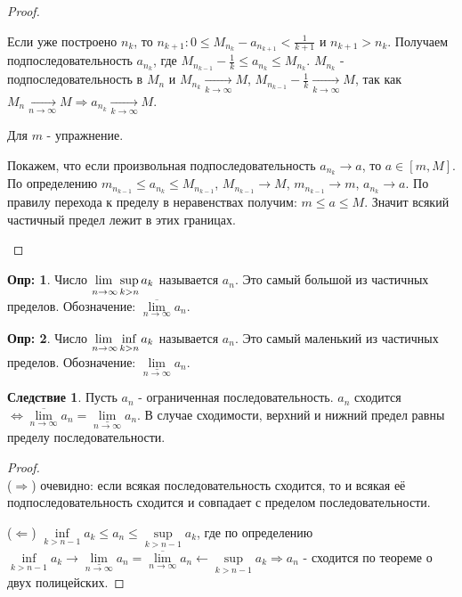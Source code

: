 \documentclass[12pt]{article}
\theoremstyle{definition}
\newtheorem{defn}{Опр:}
\newtheorem{corollary}{Следствие}
\begin{document}
\begin{proof}
\begin{enumerate}[label={(\arabic*)}]
	Если уже построено $n_k$, то $n_{k+1} \colon 0 \leq M_{n_k}\! - a_{n_{k+1}} < \frac{1}{k+1}$ и $n_{k+1} > n_k$. Получаем подпоследовательность $a_{n_k}$, где $M_{n_{k-1}}\!- \frac{1}{k} \leq a_{n_k} \leq M_{n_k}$. $M_{n_k}$ - подпоследовательность в $M_n$ и $M_{n_k}\! \xrightarrow[k \rightarrow \infty]{} M$, $M_{n_{k-1}}\!- \frac{1}{k} \xrightarrow[k \rightarrow \infty]{} M$, так как $M_n \xrightarrow[n \rightarrow \infty]{} M \Rightarrow a_{n_k}\! \xrightarrow[k \rightarrow \infty]{} M$.
	
	Для $m$ - упражнение.
	
	Покажем, что если произвольная подпоследовательность $a_{n_k}\! \rightarrow a$, то $a \in [m, M]$. По определению $m_{n_{k-1}} \leq a_{n_k} \leq M_{n_{k-1}}$, $M_{n_{k-1}}\! \rightarrow M$, $m_{n_{k-1}}\! \rightarrow m$, $a_{n_k}\! \rightarrow a$. По правилу перехода к пределу в неравенствах получим: $m \leq a \leq M$. Значит всякий частичный предел лежит в этих границах.
	\end{enumerate}
\end{proof}

\begin{defn}
	Число $\adjustlimits\lim_{n \rightarrow \infty}\sup_{k > n} a_k$ называется  $a_n$. Это самый большой из частичных пределов. Обозначение: $\underset{n \to \infty}{\overline{\lim}} a_n$.
\end{defn}

\begin{defn}
	Число $\adjustlimits\lim_{n \rightarrow \infty}\inf_{k > n} a_k$ называется  $a_n$. Это самый маленький из частичных пределов. Обозначение: $\underset{n \to \infty}{\underline{\lim}} a_n$.
\end{defn}

\begin{corollary}
	Пусть $a_n$ - ограниченная последовательность. $a_n$ сходится $\Leftrightarrow \underset{n \to \infty}{\overline{\lim}} a_n = \underset{n \to \infty}{\underline{\lim}} a_n$. В случае сходимости, верхний и нижний предел равны пределу последовательности.
\end{corollary}

\begin{proof}\hfill\\
	($\Rightarrow$) очевидно: если всякая последовательность сходится, то и всякая её подпоследовательность сходится и совпадает с пределом последовательности.
	
	($\Leftarrow$) $\inf\limits_{k > n-1} a_k \leq a_n \leq \sup\limits_{k > n-1} a_k$, где по определению $\inf\limits_{k > n-1} a_k \to \underset{n \to \infty}{\underline{\lim}} a_n = \underset{n \to \infty}{\overline{\lim}} a_n \leftarrow \sup\limits_{k > n-1} a_k \Rightarrow a_n$ - сходится по теореме о двух полицейских.
\end{proof}
\end{document}
